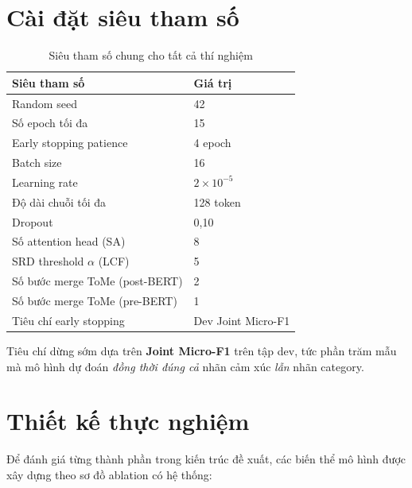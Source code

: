 \section{Cài đặt siêu tham số}
\label{sec:hyperparams}

\begin{table}[H]
\centering
\caption{Siêu tham số chung cho tất cả thí nghiệm}
\label{tab:hyperparams}
\begin{tabular}{@{}ll@{}}
\toprule
\textbf{Siêu tham số} & \textbf{Giá trị} \\
\midrule
Random seed               & 42 \\
Số epoch tối đa           & 15 \\
Early stopping patience   & 4 epoch \\
Batch size                & 16 \\
Learning rate             & $2\times10^{-5}$ \\
Độ dài chuỗi tối đa       & 128 token \\
Dropout                   & 0,10 \\
Số attention head (SA)    & 8 \\
SRD threshold $\alpha$ (LCF) & 5 \\
Số bước merge ToMe (post-BERT) & 2 \\
Số bước merge ToMe (pre-BERT)  & 1 \\
Tiêu chí early stopping   & Dev Joint Micro-F1 \\
\bottomrule
\end{tabular}
\end{table}

Tiêu chí dừng sớm dựa trên \textbf{Joint Micro-F1} trên tập dev, tức
phần trăm mẫu mà mô hình dự đoán \emph{đồng thời đúng cả} nhãn cảm
xúc \emph{lẫn} nhãn category.

\section{Thiết kế thực nghiệm}
\label{sec:exp_design}

Để đánh giá từng thành phần trong kiến trúc đề xuất, các biến thể mô
hình được xây dựng theo sơ đồ ablation có hệ thống:

\usepackage{booktabs}
\usepackage{tabularx}
\usepackage{makecell}
\usepackage{array}

